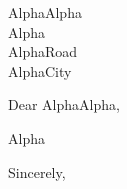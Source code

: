 \documentclass[11pt]{letter}
\newcommand{\recipient}{AlphaAlpha}
\newcommand{\company}{Alpha}
\newcommand{\companyaddress}{AlphaRoad}
\newcommand{\companycity}{AlphaCity}
\newcommand{\letterdate}{October 12, 2025}
\begin{document}
\begin{letter}{\recipient \\ \company \\ \companyaddress \\ \companycity}
\date{\letterdate}

\opening{Dear \recipient,}

Alpha

\closing{Sincerely,}

\end{letter}
\end{document}
